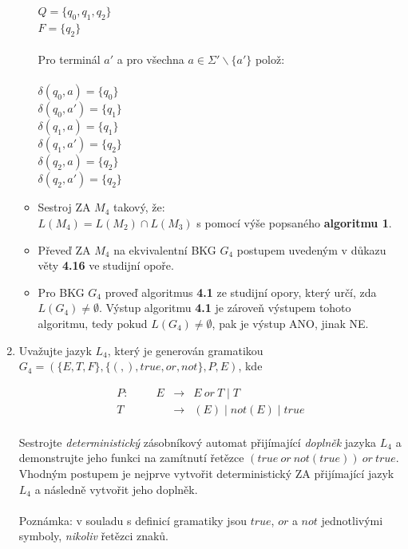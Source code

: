 \documentclass[a4paper,11pt]{article}[24.3.2010]
\begin{document}
\begin{enumerate}
\begin{itemize}
$Q=\{q_{0},q_{1},q_{2}\}$\\
$F=\{q_{2}\}$\\\\
Pro terminál $a'$ a pro všechna $a \in \Sigma'  \backslash \{a'\}$ polož:\\\\
$\delta(q_{0}, a) = \{q_{0}\}$\\
$\delta(q_{0}, a') = \{q_{1}\}$\\
$\delta(q_{1}, a) = \{q_{1}\}$\\
$\delta(q_{1}, a') = \{q_{2}\}$\\
$\delta(q_{2}, a) = \{q_{2}\}$\\
$\delta(q_{2}, a') = \{q_{2}\}$\\
\item Sestroj ZA $M_{4}$ takový, že:\\ $L(M_{4})=L(M_{2}) \cap L(M_{3})$ s pomocí výše popsaného \textbf{algoritmu 1}.\\
\item Převeď ZA $M_{4}$ na ekvivalentní BKG $G_{4}$ postupem uvedeným v důkazu věty \textbf{4.16} ve studijní opoře.\\
\item Pro BKG $G_{4}$ proveď algoritmus \textbf{4.1} ze studijní opory, který určí, zda $L(G_{4}) \neq \emptyset$. Výstup algoritmu \textbf{4.1} je zároveň výstupem tohoto algoritmu, tedy pokud $L(G_{4}) \neq \emptyset$, pak je výstup ANO, jinak NE.


\end{itemize}



\newpage

\item Uvažujte jazyk $L_{4}$, který je generován gramatikou\\
$G_{4}=(\{E,T,F\},\{(,),true,or,not\},P,E)$, kde

\begin{eqnarray*}
      P: \:\:\:\:\:\:\:\:\:\:\: E&\rightarrow&E \: or \: T \mid T\\
      T&\rightarrow&(E) \mid not(E) \mid true\\
\end{eqnarray*}

Sestrojte \emph{deterministický} zásobníkový automat přijímající \emph{doplněk} jazyka $L_{4}$ a demonstrujte jeho funkci na zamítnutí řetězce $(true \: or \: not(true)) \: or \: true$. Vhodným postupem je nejprve vytvořit deterministický ZA přijímající jazyk $L_{4}$ a následně vytvořit jeho doplněk.\\\\
Poznámka: v souladu s definicí gramatiky jsou $true$, $or$ a $not$ jednotlivými symboly, \emph{nikoliv} řetězci znaků.\\


\end{enumerate}
\end{document}
